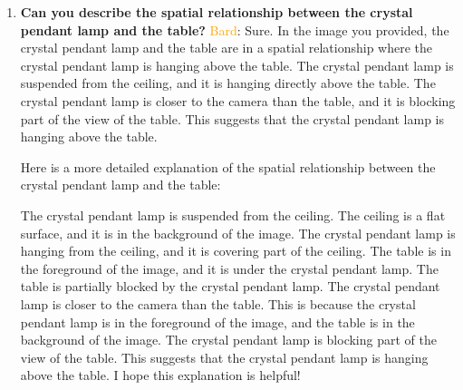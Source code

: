 \begin{enumerate}
    \item \textbf{Can you describe the spatial relationship between the crystal pendant lamp and the table?}
    \subitem 
    \textcolor{orange}{Bard}: 
    Sure. In the image you provided, the crystal pendant lamp and the table are in a spatial relationship where the crystal pendant lamp is hanging above the table. The crystal pendant lamp is suspended from the ceiling, and it is hanging directly above the table. The crystal pendant lamp is closer to the camera than the table, and it is blocking part of the view of the table. This suggests that the crystal pendant lamp is hanging above the table.
    
    Here is a more detailed explanation of the spatial relationship between the crystal pendant lamp and the table:
    
    The crystal pendant lamp is suspended from the ceiling. The ceiling is a flat surface, and it is in the background of the image. The crystal pendant lamp is hanging from the ceiling, and it is covering part of the ceiling.
    The table is in the foreground of the image, and it is under the crystal pendant lamp. The table is partially blocked by the crystal pendant lamp.
    The crystal pendant lamp is closer to the camera than the table. This is because the crystal pendant lamp is in the foreground of the image, and the table is in the background of the image.
    The crystal pendant lamp is blocking part of the view of the table. This suggests that the crystal pendant lamp is hanging above the table.
    I hope this explanation is helpful!
    

\end{enumerate}
